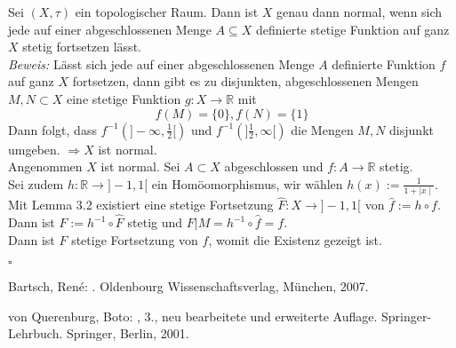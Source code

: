 \documentclass[11pt,leqno]{article}
\newcommand{\R}{\mathbb{R}}
\begin{document}
Sei $(X,\tau)$ ein topologischer Raum. Dann ist $X$ genau dann normal, wenn sich jede auf einer abgeschlossenen Menge $A\subseteq X$ definierte
stetige Funktion auf ganz $X$ stetig fortsetzen lässt. \\
\textit{Beweis:} Lässt sich jede auf einer abgeschlossenen Menge $A$ definierte Funktion $f$ auf ganz $X$ fortsetzen, dann gibt es zu disjunkten,
abgeschlossenen Mengen $M, N \subset X$ eine stetige Funktion $g:X \rightarrow \R$ mit 
\[f(M)= \{0\}, f(N)= \{1\} \]
Dann folgt, dass $f^{-1}(]-\infty, \frac{1}{2}[)$ und $f^{-1}(]\frac{1}{2}, \infty[)$ die Mengen $M,N$ disjunkt umgeben.
$\Rightarrow X$ ist normal.\\
Angenommen $X$ ist normal. Sei $A \subset X$ abgeschlossen und $f:A \rightarrow \R$ stetig. \\
Sei zudem $h:\R \rightarrow ]-1,1[$ ein Homöomorphismus, wir wählen $h(x):=\frac{1}{1+\mid x \mid}$. \\
Mit Lemma 3.2 existiert eine stetige Fortsetzung $\hat{F}:X\rightarrow]-1,1[$ von $\hat{f}:=h \circ f$.\\
Dann ist $F:=h^{-1} \circ \hat{F}$ stetig und $F\big\vert M = h^{-1}\circ \hat{f}=f$.\\
Dann ist $F$ stetige Fortsetzung von $f$, womit die Existenz gezeigt ist. 
\begin{flushright}
    $\square$
\end{flushright}

\begin{thebibliography}{99}

    {\sc Bartsch, René:}
    .
    \newblock Oldenbourg Wissenschaftsverlag, München, 2007.
    
    
    {\sc von Querenburg, Boto:}
    , 3., neu bearbeitete und erweiterte Auflage.
    \newblock Springer-Lehrbuch. Springer, Berlin, 2001.
\end{thebibliography}
\end{document}
